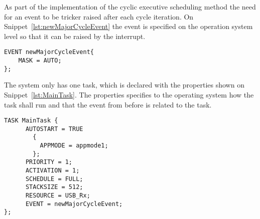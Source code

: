 As part of the implementation of the cyclic executive scheduling method the need for an event to be tricker raised after each cycle iteration. 
On Snippet~\ref{lst:newMajorCycleEvent} the event is specified on the operation system level so that it can be raised by the interrupt. 
\begin{lstlisting}[language=CSharp,label={lst:newMajorCycleEvent},caption={newMajorCycleEvent event from nxt.oil}]
EVENT newMajorCycleEvent{
    MASK = AUTO;
};
\end{lstlisting}

The system only has one task, which is declared with the properties shown on Snippet~\ref{lst:MainTask}. 
The properties specifies to the operating system how the task shall run and that the event from before is related to the task.
\begin{lstlisting}[language=CSharp,label={lst:MainTask},caption={MainTaks task from nxt.oil}]
    TASK MainTask {
      AUTOSTART = TRUE 
        {
          APPMODE = appmode1;
        };
      PRIORITY = 1;
      ACTIVATION = 1;
      SCHEDULE = FULL;
      STACKSIZE = 512;
      RESOURCE = USB_Rx;
      EVENT = newMajorCycleEvent;
};
\end{lstlisting}